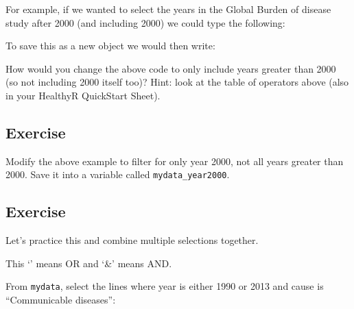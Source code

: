 \documentclass[]{book}
\makeatletter
\newenvironment{Shaded}{\begin{snugshade}}{\end{snugshade}}
\newcommand{\KeywordTok}[1]{\textcolor[rgb]{0.13,0.29,0.53}{\textbf{#1}}}
\newcommand{\DecValTok}[1]{\textcolor[rgb]{0.00,0.00,0.81}{#1}}
\newcommand{\StringTok}[1]{\textcolor[rgb]{0.31,0.60,0.02}{#1}}
\newcommand{\CommentTok}[1]{\textcolor[rgb]{0.56,0.35,0.01}{\textit{#1}}}
\newcommand{\OperatorTok}[1]{\textcolor[rgb]{0.81,0.36,0.00}{\textbf{#1}}}
\newcommand{\NormalTok}[1]{#1}
\newenvironment{kframe}{%
\medskip{}
\setlength{\fboxsep}{.8em}
 \def\at@end@of@kframe{}%
 \ifinner\ifhmode%
  \def\at@end@of@kframe{\end{minipage}}%
  \begin{minipage}{\columnwidth}%
 \fi\fi%
 \def\FrameCommand##1{\hskip\@totalleftmargin \hskip-\fboxsep
 \colorbox{shadecolor}{##1}\hskip-\fboxsep
     \hskip-\linewidth \hskip-\@totalleftmargin \hskip\columnwidth}%
 \MakeFramed {\advance\hsize-\width
   \@totalleftmargin\z@ \linewidth\hsize
   \@setminipage}}%
 {\par\unskip\endMakeFramed%
 \at@end@of@kframe}
\renewenvironment{Shaded}{\begin{kframe}}{\end{kframe}}
\makeatother
\begin{document}
For example, if we wanted to select the years in the Global Burden of
disease study after 2000 (and including 2000) we could type the
following:

\begin{Shaded}
\end{Shaded}

To save this as a new object we would then write:

\begin{Shaded}
\end{Shaded}

How would you change the above code to only include years greater than
2000 (so not including 2000 itself too)? Hint: look at the table of
operators above (also in your HealthyR QuickStart Sheet).

\subsection{Exercise}\label{exercise-6}

Modify the above example to filter for only year 2000, not all years
greater than 2000. Save it into a variable called
\texttt{mydata\_year2000}.

\subsection{Exercise}\label{exercise-7}

Let's practice this and combine multiple selections together.

This `\textbar{}' means OR and `\&' means AND.

From \texttt{mydata}, select the lines where year is either 1990 or 2013
and cause is ``Communicable diseases'':
\end{document}
